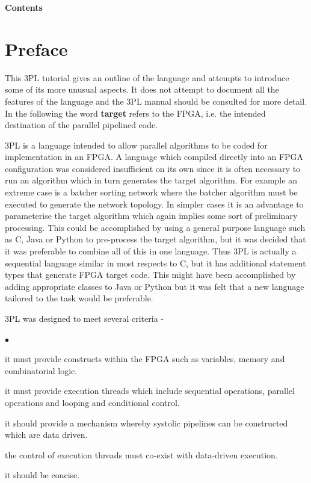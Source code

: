 \documentclass[10pt,a4paper,twoside,fleqn]{article}
\newcommand{\blist}{\begin{list}{$\bullet$}{\setlength{\itemsep}{-5pt}\setlength{\topsep}{-5pt}}}
\newcommand{\blend}{\end{list}}
\begin{document}
  

\makecsirotitle
  

{\sffamily\bfseries\Large Contents} \\

\setlength{\parskip}{0pt}
\articletoc
\setlength{\parskip}{0.6pc plus 0.2pc minus 0.2pc}

\cleardoublepage

\setcounter{page}{1}



\section{Preface}

    This 3PL tutorial gives an outline of the language and attempts to introduce
    some of its more unusual aspects. It does not attempt to document all the
    features of the language and the 3PL manual should be consulted for more
    detail. In the following the word {\bf target} refers to the FPGA, i.e. the
    intended destination of the parallel pipelined code.
    
    3PL is a language intended to allow parallel algorithms to be coded for implementation
    in an FPGA. A language which compiled directly into an FPGA configuration was considered
    insufficient on its own since it is often necessary to run an algorithm which in turn
    generates the target algorithm. For example an extreme case is a batcher sorting network
    where the batcher algorithm must be executed to generate the network topology. In simpler
    cases it is an advantage to parameterise the target algorithm which again implies some
    sort of preliminary processing. This could be accomplished by using a general purpose
    language such as C, Java or Python to pre-process the target algorithm, but it was
    decided that it was preferable to combine all of this in one language. Thus 3PL
    is actually a sequential language similar in most respects to C, but it has additional
    statement types that generate FPGA target code. This might have been accomplished by
    adding appropriate classes to Java or Python but it was felt that a new language
    tailored to the task would be preferable.    
    
    3PL was designed to meet several criteria -
    
    \blist
    \item   it must provide constructs within the FPGA such as variables, memory
    and combinatorial logic.
    \item   it must provide execution threads which include
    sequential operations, parallel operations and looping and conditional control.
    \item   it should provide a mechanism whereby systolic pipelines can be constructed
    which are data driven.
    \item   the control of execution threads must co-exist with data-driven execution.
    \item   it should be concise.
    \blend
    
\end{document}
